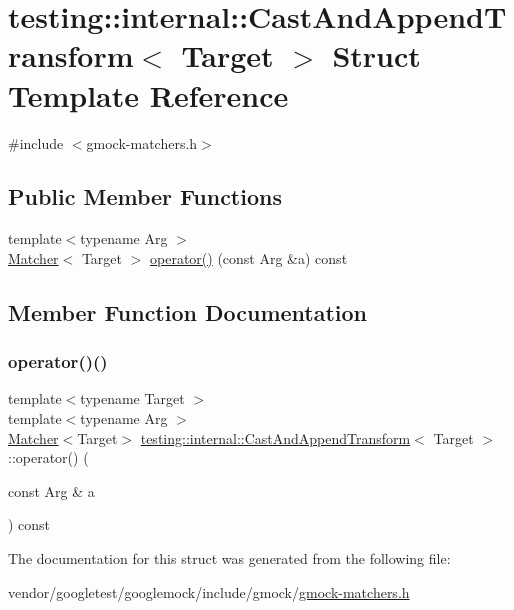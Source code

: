 \hypertarget{structtesting_1_1internal_1_1_cast_and_append_transform}{}\section{testing\+:\+:internal\+:\+:Cast\+And\+Append\+Transform$<$ Target $>$ Struct Template Reference}
\label{structtesting_1_1internal_1_1_cast_and_append_transform}


{\ttfamily \#include $<$gmock-\/matchers.\+h$>$}

\subsection*{Public Member Functions}
\begin{DoxyCompactItemize}
\item 
{\footnotesize template$<$typename Arg $>$ }\\\hyperlink{classtesting_1_1_matcher}{Matcher}$<$ Target $>$ \hyperlink{structtesting_1_1internal_1_1_cast_and_append_transform_a90e722b0df4f0e6368bd89b848b71f45}{operator()} (const Arg \&a) const
\end{DoxyCompactItemize}


\subsection{Member Function Documentation}
\mbox{\label{structtesting_1_1internal_1_1_cast_and_append_transform_a90e722b0df4f0e6368bd89b848b71f45}} 
\subsubsection{\texorpdfstring{operator()()}{operator()()}}
{\footnotesize\ttfamily template$<$typename Target $>$ \\
template$<$typename Arg $>$ \\
\hyperlink{classtesting_1_1_matcher}{Matcher}$<$Target$>$ \hyperlink{structtesting_1_1internal_1_1_cast_and_append_transform}{testing\+::internal\+::\+Cast\+And\+Append\+Transform}$<$ Target $>$\+::operator() (\begin{DoxyParamCaption}\item[{const Arg \&}]{a }\end{DoxyParamCaption}) const\hspace{0.3cm}{\ttfamily [inline]}}



The documentation for this struct was generated from the following file\+:\begin{DoxyCompactItemize}
\item 
vendor/googletest/googlemock/include/gmock/\hyperlink{gmock-matchers_8h}{gmock-\/matchers.\+h}\end{DoxyCompactItemize}
